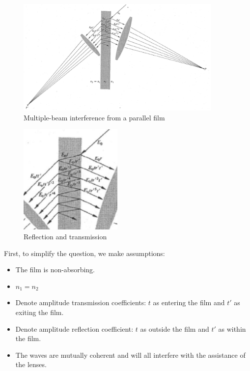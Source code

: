 \documentclass[UTF8]{book}
\begin{document}
\begin{figure}[htbp]
\vspace{-10pt}
\centering
\label{fig:22}
\includegraphics[width=0.9\textwidth]{Figure/22.PNG}
\caption{Multiple-beam interference from a parallel film}
\end{figure}

\begin{figure}
  \vspace{-20pt}
  \begin{center}
    \includegraphics[width=0.45\textwidth]{Figure/23.PNG}
  \end{center}  
  \vspace{-10pt}
  \caption{Reflection and transmission}
  \vspace{-50pt}
\end{figure}

First, to simplify the question, we make assumptions:
\begin{itemize}
\item The film is non-absorbing.
\item $n_1=n_2$
\item Denote amplitude transmission coefficients: $t$ as entering the film and $t'$ as exiting the film.
\item Denote amplitude reflection coefficient: $t$ as outside the film and $t'$ as within the film.
\item The waves are mutually coherent and will all interfere with the assistance of the lenses.
\end{itemize}
\end{document}
